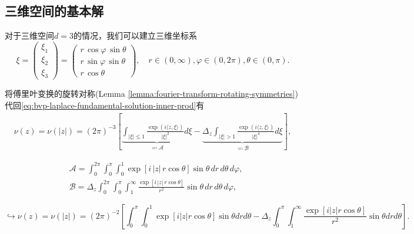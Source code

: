 \subsection{三维空间的基本解}
对于三维空间$d=3$的情况，我们可以建立三维坐标系
\begin{equation*}
  \xi = \begin{pmatrix}
  \xi_{1} \\
  \xi_{2} \\
  \xi_{3}
  \end{pmatrix}
  =
  \begin{pmatrix}
  r \, \cos \varphi \, \sin \theta\\
  r \, \sin \varphi \, \sin \theta\\
  r \, \cos \theta
  \end{pmatrix}, \quad r \in (0,\infty), \varphi \in (0, 2\pi), \theta \in (0,\pi).
\end{equation*}

将傅里叶变换的旋转对称(Lemma \ref{lemma:fourier-transform-rotating-symmetries})代回\eqref{eq:bvp-laplace-fundamental-solution-inner-prod}有
\begin{equation*}
  \begin{split}
    \nu(z) = \nu(|z|) = \left(2 \pi \right)^{-3}
    \left[
    \underbrace{
    \int_{|\xi| \le 1}
    \frac{
    \exp \left( i \langle z, \xi \rangle \right)
    }{
    |\xi|^2
    }
    d \xi
    }_{\eqqcolon \mathcal{A}}
    - \underbrace{
    \Delta_{z}
    \int_{|\xi| > 1}
    \frac{
    \exp \left( i \langle z, \xi \rangle \right)
    }{
    |\xi|^4
    }
    d \xi
    }_{\eqqcolon \mathcal{B}}
    \right],
  \end{split}
\end{equation*}

\begin{equation*}
\begin{split}
  &\mathcal{A} = \int_{0}^{2 \pi} \int_{0}^{\pi} \int_{0}^{1}
  \exp \left[ i \, |z| \, r \cos \theta \right]
  \sin \theta
  \, dr \, d \theta \, d \varphi, \\
  &\mathcal{B} = \Delta_{z} \int_{0}^{2\pi} \int_{0}^{\pi} \int_{1}^{\infty}
  \frac{
  \exp \left[ i \, |z| \, r \cos \theta \right]
  }{r^2}
  \sin \theta
  \, dr \, d \theta \, d \varphi,
\end{split}
\end{equation*}


\begin{equation*}
\hookrightarrow \nu(z) = \nu(|z|) = \left(2 \pi \right)^{-2}
  \left[
  \int_{0}^{\pi} \int_{0}^{1}
  \exp \left[ i |z|  r \cos \theta \right]
  \sin \theta
  dr d \theta
  -\Delta_{z} \int_{0}^{\pi} \int_{1}^{\infty}
  \frac{
  \exp \left[ i  |z|  r \cos \theta \right]
  }{r^2}
  \sin \theta
   dr  d \theta
  \right].
\end{equation*}

